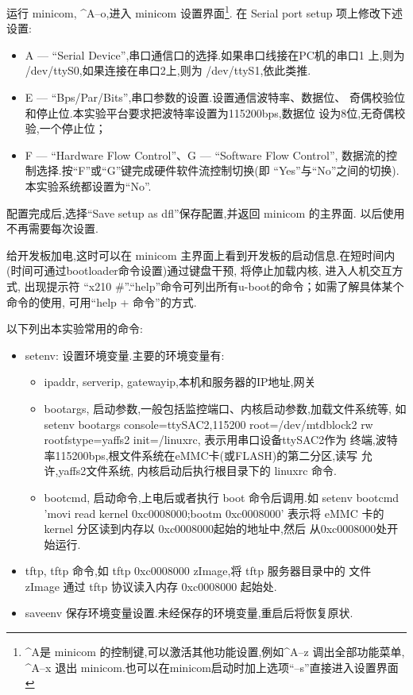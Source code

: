     运行 minicom, \^{}A--o,进入 minicom 设置界面\footnote{\^{}A是
minicom 的控制键,可以激活其他功能设置,例如\^{}A--z 调出全部功能菜单,
\^{}A--x 退出 minicom.也可以在minicom启动时加上选项``--s''直接进入设置界面}.
在 Serial port setup 项上修改下述设置:
\begin{itemize}\itemsep=-3pt
  \item A --- ``Serial Device'',串口通信口的选择.如果串口线接在PC机的串口1
		上,则为 /dev/ttyS0,如果连接在串口2上,则为 /dev/ttyS1,依此类推.
  \item E --- ``Bps/Par/Bits'',串口参数的设置.设置通信波特率、数据位、
		奇偶校验位和停止位.本实验平台要求把波特率设置为115200bps,数据位
		设为8位,无奇偶校验,一个停止位；
  \item F --- ``Hardware Flow Control''、G --- ``Software Flow Control'',
		数据流的控制选择.按``F''或``G''键完成硬件软件流控制切换(即
		``Yes''与``No''之间的切换).本实验系统都设置为``No''.
\end{itemize}

	配置完成后,选择``Save setup as dfl''保存配置,并返回 minicom 的主界面.
以后使用不再需要每次设置.

	给开发板加电,这时可以在 minicom 主界面上看到开发板的启动信息.在短时间内
(时间可通过bootloader命令设置)通过键盘干预, 将停止加载内核, 进入人机交互方式,
出现提示符 ``x210 \#''.``help''命令可列出所有u-boot的命令；如需了解具体某个
命令的使用, 可用``help + 命令''的方式.

	以下列出本实验常用的命令:
\begin{itemize}
  \item setenv: 设置环境变量.主要的环境变量有:
  \begin{itemize}
    \item ipaddr, serverip, gatewayip,本机和服务器的IP地址,网关
    \item bootargs, 启动参数,一般包括监控端口、内核启动参数,加载文件系统等,
		如 setenv bootargs console=ttySAC2,115200 root=/dev/mtdblock2 rw
             rootfstype=yaffs2 init=/linuxrc, 表示用串口设备ttySAC2作为
		终端,波特率115200bps,根文件系统在eMMC卡(或FLASH)的第二分区,读写
		允许,yaffs2文件系统, 内核启动后执行根目录下的 linuxrc 命令.
	\item bootcmd, 启动命令,上电后或者执行 boot 命令后调用.如
		setenv bootcmd 'movi read kernel 0xc0008000;bootm 0xc0008000'
		表示将 eMMC 卡的 kernel 分区读到内存以 0xc0008000起始的地址中,然后
		从0xc0008000处开始运行.
  \end{itemize}
  \item tftp, tftp 命令,如 tftp 0xc0008000 zImage,将 tftp 服务器目录中的
        文件 zImage 通过 tftp 协议读入内存 0xc0008000 起始处.
  \item saveenv 保存环境变量设置.未经保存的环境变量,重启后将恢复原状.
\end{itemize}


